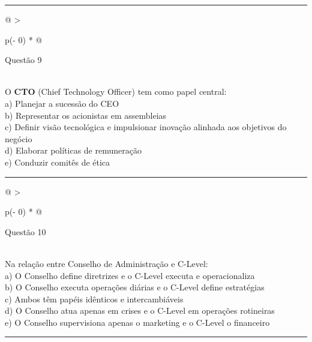 \documentclass[
]{book}
\begin{document}
\begin{center}\rule{0.5\linewidth}{0.5pt}\end{center}

\begin{longtable}[]{@{}
  >{\raggedright\arraybackslash}p{(\columnwidth - 0\tabcolsep) * }@{}}
\toprule\noalign{}
\begin{minipage}[b]{\linewidth}\raggedright
Questão 9
\end{minipage} \\
\midrule\noalign{}
\endhead
\bottomrule\noalign{}
\endlastfoot
O \textbf{CTO} (Chief Technology Officer) tem como papel central: \\
a) Planejar a sucessão do CEO \\
b) Representar os acionistas em assembleias \\
c) Definir visão tecnológica e impulsionar inovação alinhada aos objetivos do negócio \\
d) Elaborar políticas de remuneração \\
e) Conduzir comitês de ética \\
\end{longtable}

\begin{center}\rule{0.5\linewidth}{0.5pt}\end{center}

\begin{longtable}[]{@{}
  >{\raggedright\arraybackslash}p{(\columnwidth - 0\tabcolsep) * }@{}}
\toprule\noalign{}
\begin{minipage}[b]{\linewidth}\raggedright
Questão 10
\end{minipage} \\
\midrule\noalign{}
\endhead
\bottomrule\noalign{}
\endlastfoot
Na relação entre Conselho de Administração e C-Level: \\
a) O Conselho define diretrizes e o C-Level executa e operacionaliza \\
b) O Conselho executa operações diárias e o C-Level define estratégias \\
c) Ambos têm papéis idênticos e intercambiáveis \\
d) O Conselho atua apenas em crises e o C-Level em operações rotineiras \\
e) O Conselho supervisiona apenas o marketing e o C-Level o financeiro \\
\end{longtable}

\begin{center}\rule{0.5\linewidth}{0.5pt}\end{center}
\end{document}
